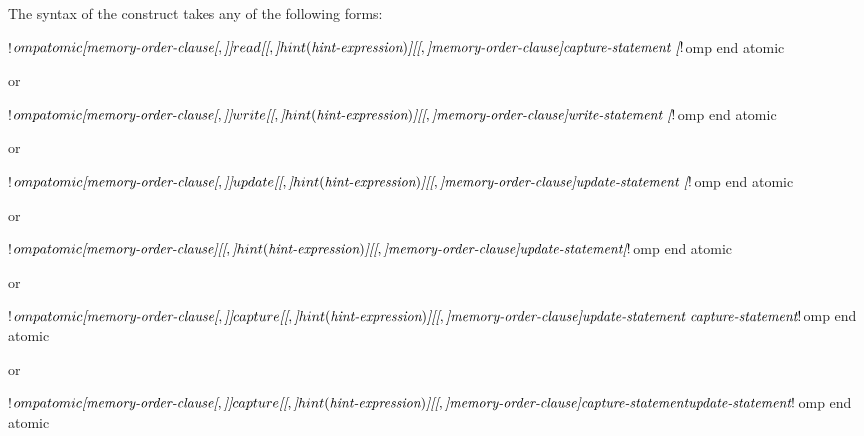 \begin{fortranspecific}
The syntax of the  construct takes any of the following forms:

\begin{ompfPragma}
!$omp atomic \plc{[memory-order-clause[},\plc{]]} read \plc{[[},\plc{]}hint(\plc{hint-expression})\plc{]}
             \plc{[[},\plc{]memory-order-clause]}
    \plc{capture-statement }
\plc{[}!$omp end atomic\plc{]}
\end{ompfPragma}

or

\begin{ompfPragma}
!$omp atomic \plc{[memory-order-clause[},\plc{]]} write \plc{[[},\plc{]}hint(\plc{hint-expression})\plc{]}
             \plc{[[},\plc{]memory-order-clause]}
    \plc{write-statement }
\plc{[}!$omp end atomic\plc{]}
\end{ompfPragma}

or

\begin{ompfPragma}
!$omp atomic \plc{[memory-order-clause[},\plc{]]} update \plc{[[},\plc{]}hint(\plc{hint-expression})\plc{]}
             \plc{[[},\plc{]memory-order-clause]}
    \plc{update-statement }
\plc{[}!$omp end atomic\plc{]}
\end{ompfPragma}

or

\begin{ompfPragma}
!$omp atomic \plc{[memory-order-clause]} \plc{[[},\plc{]}hint(\plc{hint-expression})\plc{]}
             \plc{[[},\plc{]memory-order-clause]}
    \plc{update-statement}
\plc{[}!$omp end atomic\plc{]}
\end{ompfPragma}

or

\begin{ompfPragma}
!$omp atomic \plc{[memory-order-clause[},\plc{]]} capture \plc{[[},\plc{]}hint(\plc{hint-expression})\plc{]}
             \plc{[[},\plc{]memory-order-clause]}
    \plc{update-statement }
    \plc{capture-statement}
!$omp end atomic
\end{ompfPragma}

or

\begin{ompfPragma}
!$omp atomic \plc{[memory-order-clause[},\plc{]]} capture \plc{[[},\plc{]}hint(\plc{hint-expression})\plc{]}
             \plc{[[},\plc{]memory-order-clause]}
    \plc{capture-statement}
    \plc{update-statement}
!$omp end atomic
\end{ompfPragma}


\end{fortranspecific}
